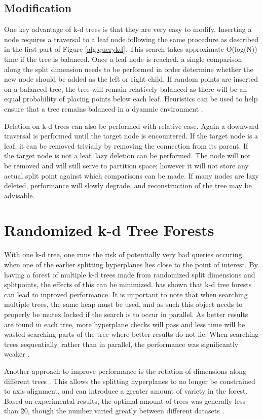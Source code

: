 \subsection{Modification}
\label{sec:kdmod}

One key advantage of k-d trees is that they are very easy to modify.  Inserting a node requires a traversal to a leaf node following the same procedure as described in the first part of Figure \ref{alg:querykd}.  This search takes approximate O(log(N)) time if the tree is balanced.  Once a leaf node is reached, a single comparison along the split dimension needs to be performed in order determine whether the new node should be added as the left or right child.  If random points are inserted on a balanced tree, the tree will remain relatively balanced as there will be an equal probability of placing points below each leaf.  Heuristics can be used to help ensure that a tree remains balanced in a dyanmic environment \citep{hunt2006fast}.

Deletion on k-d trees can also be performed with relative ease.  Again a downward traversal is performed until the target node is encountered. If the target node is a leaf, it can be removed trivially by removing the connection from its parent.  If the target node is not a leaf, lazy deletion can be performed.  The node will not be removed and will still serve to partition space; however it will not store any actual split point against which comparisons can be made.  If many nodes are lazy deleted, performance will slowly degrade, and reconstruction of the tree may be advisable.

\section{Randomized k-d Tree Forests}
\label{sec:randomforest}

With one k-d tree, one runs the risk of potentially very bad queries occuring when one of the earlier splitting hyperplanes lies close to the point of interest.  By having a forest of multiple k-d trees made from randomized split dimensions and splitpoints, the effects of this can be minimized.  \citep{silpa2008optimised} has shown that k-d tree forests can lead to inproved performance.  It is important to note that when searching multiple trees, the same heap must be used, and as such this object needs to properly be mutex locked if the search is to occur in parallel.  As better results are found in each tree, more hyperplane checks will pass and less time will be wasted searching parts of the tree where better results do not lie.  When searching trees sequentially, rather than in parallel, the performance was significantly weaker \citep{silpa2008optimised}.

Another approach to improve performance is the rotation of dimensions along different trees \citep{silpa2008optimised}.  This allows the splitting hyperplanes to no longer be constrained to axis alignment, and can introduce a greater amount of variety in the forest.  Based on experimental results, the optimal amount of trees was generally less than 20, though the number varied greatly between different datasets \citep{muja_flann_2009}.
